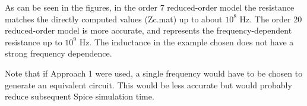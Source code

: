 
As can be seen in the figures, in the order 7 reduced-order model the
resistance matches the directly computed values (Zc.mat) up to about
$10^8$ Hz. The order 20 reduced-order model is more accurate, and
represents the frequency-dependent resistance up to $10^{9}$ Hz. The
inductance in the example chosen does not have a strong frequency
dependence.

Note that if Approach 1 were used, a single frequency would have to be
chosen to generate an equivalent circuit. This would be less accurate
but would probably reduce subsequent Spice simulation time.

